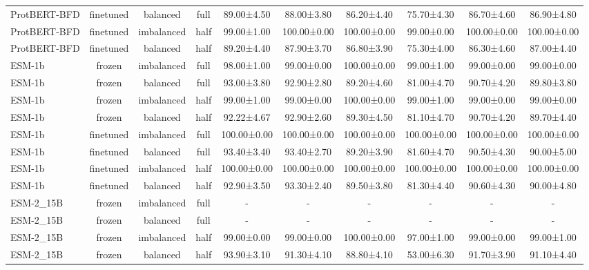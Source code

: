 \begin{tabular}{lccccccccc}
ProtBERT-BFD &      finetuned &   balanced &      full &  89.00±4.50 &  88.00±3.80 &  86.20±4.40 &  75.70±4.30 &  86.70±4.60 &  86.90±4.80 \\
ProtBERT-BFD &      finetuned & imbalanced &      half &  99.00±1.00 & 100.00±0.00 & 100.00±0.00 &  99.00±0.00 & 100.00±0.00 & 100.00±0.00 \\
ProtBERT-BFD &      finetuned &   balanced &      half &  89.20±4.40 &  87.90±3.70 &  86.80±3.90 &  75.30±4.00 &  86.30±4.60 &  87.00±4.40 \\
      ESM-1b &         frozen & imbalanced &      full &  98.00±1.00 &  99.00±0.00 & 100.00±0.00 &  99.00±1.00 &  99.00±0.00 &  99.00±0.00 \\
      ESM-1b &         frozen &   balanced &      full &  93.00±3.80 &  92.90±2.80 &  89.20±4.60 &  81.00±4.70 &  90.70±4.20 &  89.80±3.80 \\
      ESM-1b &         frozen & imbalanced &      half &  99.00±1.00 &  99.00±0.00 & 100.00±0.00 &  99.00±1.00 &  99.00±0.00 &  99.00±0.00 \\
      ESM-1b &         frozen &   balanced &      half &  92.22±4.67 &  92.90±2.60 &  89.30±4.50 &  81.10±4.70 &  90.70±4.20 &  89.70±4.40 \\
      ESM-1b &      finetuned & imbalanced &      full & 100.00±0.00 & 100.00±0.00 & 100.00±0.00 & 100.00±0.00 & 100.00±0.00 & 100.00±0.00 \\
      ESM-1b &      finetuned &   balanced &      full &  93.40±3.40 &  93.40±2.70 &  89.20±3.90 &  81.60±4.70 &  90.50±4.30 &  90.00±5.00 \\
      ESM-1b &      finetuned & imbalanced &      half & 100.00±0.00 & 100.00±0.00 & 100.00±0.00 & 100.00±0.00 & 100.00±0.00 & 100.00±0.00 \\
      ESM-1b &      finetuned &   balanced &      half &  92.90±3.50 &  93.30±2.40 &  89.50±3.80 &  81.30±4.40 &  90.60±4.30 &  90.00±4.80 \\
   ESM-2\_15B &         frozen & imbalanced &      full &           - &           - &           - &           - &           - &           - \\
   ESM-2\_15B &         frozen &   balanced &      full &           - &           - &           - &           - &           - &           - \\
   ESM-2\_15B &         frozen & imbalanced &      half &  99.00±0.00 &  99.00±0.00 & 100.00±0.00 &  97.00±1.00 &  99.00±0.00 &  99.00±1.00 \\
   ESM-2\_15B &         frozen &   balanced &      half &  93.90±3.10 &  91.30±4.10 &  88.80±4.10 &  53.00±6.30 &  91.70±3.90 &  91.10±4.40 \\

\end{tabular}
